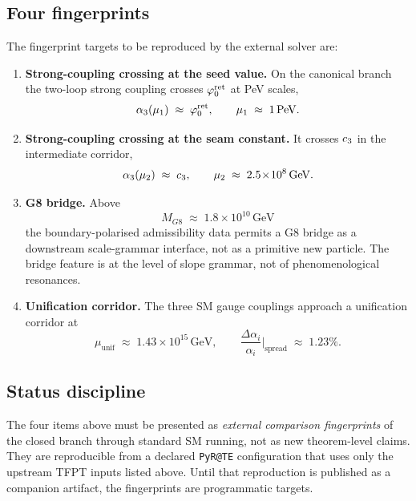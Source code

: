 \documentclass[11pt,a4paper]{article}
\begin{document}
\subsection{Four fingerprints}

The fingerprint targets to be reproduced by the external solver are:

\begin{enumerate}[leftmargin=1.5em]
    \item \textbf{Strong-coupling crossing at the seed value.} On the canonical branch the
    two-loop strong coupling crosses $\varphi_0^{\mathrm{ret}}$ at PeV scales,
    \[
    \alpha_3(\mu_1)\;\approx\;\varphi_0^{\mathrm{ret}},
    \qquad
    \mu_1\;\approx\;1\,\mathrm{PeV}.
    \]

    \item \textbf{Strong-coupling crossing at the seam constant.} It crosses $c_3$ in the
    intermediate corridor,
    \[
    \alpha_3(\mu_2)\;\approx\;c_3,
    \qquad
    \mu_2\;\approx\;2.5\!\times\!10^{8}\,\mathrm{GeV}.
    \]

    \item \textbf{G8 bridge.} Above
    \[
    M_{G8}\;\approx\;1.8\!\times\!10^{10}\,\mathrm{GeV}
    \]
    the boundary-polarised admissibility data permits a G8 bridge as a downstream scale-grammar
    interface, not as a primitive new particle. The bridge feature is at the level of slope
    grammar, not of phenomenological resonances.

    \item \textbf{Unification corridor.} The three SM gauge couplings approach a unification
    corridor at
    \[
    \mu_{\mathrm{unif}}\;\approx\;1.43\!\times\!10^{15}\,\mathrm{GeV},
    \qquad
    \frac{\Delta\alpha_i}{\alpha_i}\Big|_{\mathrm{spread}}\;\approx\;1.23\%.
    \]
\end{enumerate}

\subsection{Status discipline}

\begin{remark}
The four items above must be presented as \emph{external comparison fingerprints} of the closed
branch through standard SM running, not as new theorem-level claims. They are reproducible from a
declared \texttt{PyR@TE} configuration that uses only the upstream TFPT inputs listed above.
Until that reproduction is published as a companion artifact, the fingerprints are programmatic
targets.
\end{remark}
\end{document}
